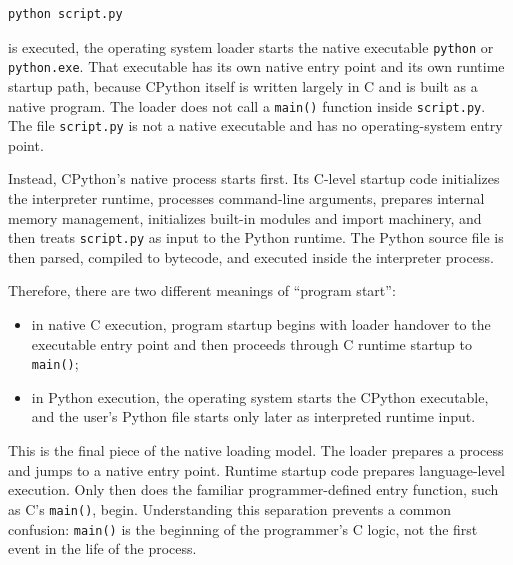 \begin{verbatim}
python script.py
\end{verbatim}

is executed, the operating system loader starts the native executable \texttt{python} or \texttt{python.exe}. That executable has its own native entry point and its own runtime startup path, because CPython itself is written largely in C and is built as a native program. The loader does not call a \texttt{main()} function inside \texttt{script.py}. The file \texttt{script.py} is not a native executable and has no operating-system entry point.

Instead, CPython's native process starts first. Its C-level startup code initializes the interpreter runtime, processes command-line arguments, prepares internal memory management, initializes built-in modules and import machinery, and then treats \texttt{script.py} as input to the Python runtime. The Python source file is then parsed, compiled to bytecode, and executed inside the interpreter process.

Therefore, there are two different meanings of ``program start'':

\begin{itemize}
    \item in native C execution, program startup begins with loader handover to the executable entry point and then proceeds through C runtime startup to \texttt{main()};
    \item in Python execution, the operating system starts the CPython executable, and the user's Python file starts only later as interpreted runtime input.
\end{itemize}

This is the final piece of the native loading model. The loader prepares a process and jumps to a native entry point. Runtime startup code prepares language-level execution. Only then does the familiar programmer-defined entry function, such as C's \texttt{main()}, begin. Understanding this separation prevents a common confusion: \texttt{main()} is the beginning of the programmer's C logic, not the first event in the life of the process.

